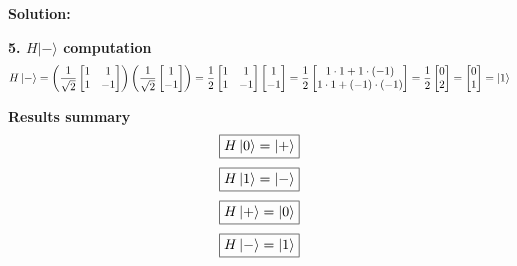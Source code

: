 \documentclass[11pt]{article}
\newenvironment{solution}
{\par\noindent\textbf{Solution:}\par}
{\vspace{1em}}
\begin{document}
\begin{solution}
\textbf{5. $H|-\rangle$ computation}
\[
H\ket{-} = \left(\frac{1}{\sqrt{2}} \begin{bmatrix}1&1\\1&-1\end{bmatrix}\right) \left(\frac{1}{\sqrt{2}} \begin{bmatrix}1\\-1\end{bmatrix}\right) = \frac{1}{2} \begin{bmatrix}1&1\\1&-1\end{bmatrix} \begin{bmatrix}1\\-1\end{bmatrix} = \frac{1}{2} \begin{bmatrix}1\cdot 1 + 1 \cdot (-1)\\1 \cdot 1 + (-1) \cdot (-1)\end{bmatrix} = \frac{1}{2} \begin{bmatrix}0\\2\end{bmatrix} = \begin{bmatrix}0\\1\end{bmatrix} = \ket{1}
\]

\textbf{Results summary}
\[\boxed{H\ket{0} = \ket{+}}\]
\[\boxed{H\ket{1} = \ket{-}}\]
\[\boxed{H\ket{+} = \ket{0}}\]
\[\boxed{H\ket{-} = \ket{1}}\]

\end{solution}
\end{document}
